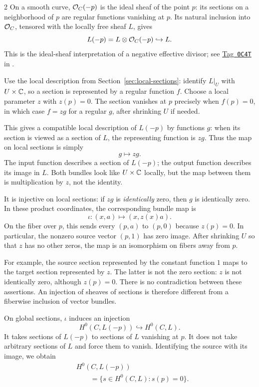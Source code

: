 \documentclass[12pt]{memoir}
\newcommand{\RRtag}[1]{\href{https://stacks.math.columbia.edu/tag/#1}{Tag~\texttt{#1}}}
\begin{document}
\begin{multicols}{2}
On a smooth curve, $\mathcal{O}_C(-p)$ is the ideal sheaf of the point $p$:
its sections on a neighborhood of $p$ are regular functions vanishing
at $p$. Its natural inclusion into $\mathcal{O}_C$, tensored with the locally
free sheaf $L$, gives
\[
 L(-p)=L\otimes\mathcal{O}_C(-p)\hookrightarrow L.
\]
This is the ideal-sheaf interpretation of a negative effective
divisor; see \RRtag{0C4T} in \cite{Stacks}.

Use the local description from Section~\ref{sec:local-sections}:
identify $L|_U$ with $U\times\mathbb{C}$, so a section is represented by
a regular function $f$. Choose a local parameter $z$ with $z(p)=0$.
The section vanishes at $p$ precisely when $f(p)=0$, in which case
$f=zg$ for a regular $g$, after shrinking $U$ if needed.

This gives a compatible local description of $L(-p)$ by functions
$g$: when its section is viewed as a section of $L$, the representing
function is $zg$. Thus the map on local sections is simply
\[
 g\longmapsto zg.
\]
The input function describes a section of $L(-p)$; the output
function describes its image in $L$. Both bundles look like
$U\times\mathbb{C}$ locally, but the map between them is multiplication
by $z$, not the identity.

It is injective on local sections: if $zg$ is \emph{identically}
zero, then $g$ is identically zero. In these product coordinates,
the corresponding bundle map is
\[
 \iota:(x,a)\longmapsto(x,z(x)a).
\]
On the fiber over $p$, this sends every $(p,a)$ to $(p,0)$ because
$z(p)=0$. In particular, the nonzero source vector $(p,1)$ has zero
image. After shrinking $U$ so that $z$ has no other zeros, the map
is an isomorphism on fibers away from $p$.

For example, the source section represented by the constant
function $1$ maps to the target section represented by $z$.
The latter is not the zero section: $z$ is not identically zero,
although $z(p)=0$. There is no contradiction between these assertions.
An injection of sheaves of sections is therefore different from a
fiberwise inclusion of vector bundles.

On global sections, $\iota$ induces an injection
\[
 H^0(C,L(-p))\hookrightarrow H^0(C,L).
\]
It takes sections of $L(-p)$ to sections of $L$ vanishing at $p$.
It does not take arbitrary sections of $L$ and force them to vanish.
Identifying the source with its image, we obtain
\[
\begin{aligned}
 &H^0(C,L(-p))\\
 &\qquad=\{s\in H^0(C,L):s(p)=0\}.
\end{aligned}
\]


\end{multicols}
\end{document}
